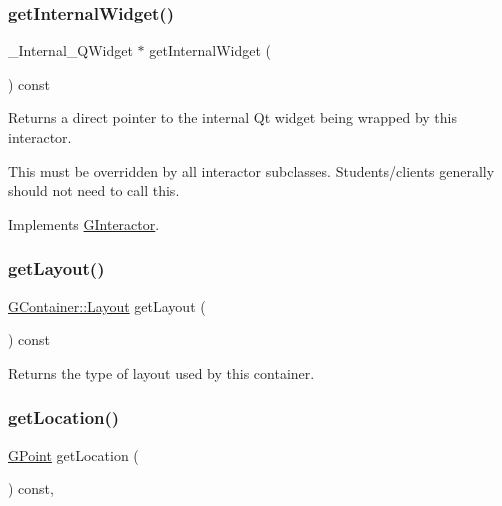 \mbox{\label{classGContainer_a208ce13c1da40bf0ddb509daf99d6588}} 
\subsubsection{\texorpdfstring{get\+Internal\+Widget()}{getInternalWidget()}}
{\footnotesize\ttfamily \+\_\+\+Internal\+\_\+\+Q\+Widget $\ast$ get\+Internal\+Widget (\begin{DoxyParamCaption}{ }\end{DoxyParamCaption}) const\hspace{0.3cm}{\ttfamily [virtual]}}



Returns a direct pointer to the internal Qt widget being wrapped by this interactor. 

This must be overridden by all interactor subclasses. Students/clients generally should not need to call this. 

Implements \mbox{\hyperlink{classGInteractor}{G\+Interactor}}.

\mbox{\label{classGContainer_aeebcf77b7fdc91a1ba0371cc9b91d5e2}} 
\subsubsection{\texorpdfstring{get\+Layout()}{getLayout()}}
{\footnotesize\ttfamily \mbox{\hyperlink{classGContainer_a1b7da28ed84c0763e8f92cde2df4799b}{G\+Container\+::\+Layout}} get\+Layout (\begin{DoxyParamCaption}{ }\end{DoxyParamCaption}) const\hspace{0.3cm}{\ttfamily [virtual]}}



Returns the type of layout used by this container. 

\mbox{\label{classGInteractor_a4f83802015511edeb63b892830812c11}} 
\subsubsection{\texorpdfstring{get\+Location()}{getLocation()}}
{\footnotesize\ttfamily \mbox{\hyperlink{classGPoint}{G\+Point}} get\+Location (\begin{DoxyParamCaption}{ }\end{DoxyParamCaption}) const\hspace{0.3cm}{\ttfamily [virtual]}, {\ttfamily [inherited]}}



